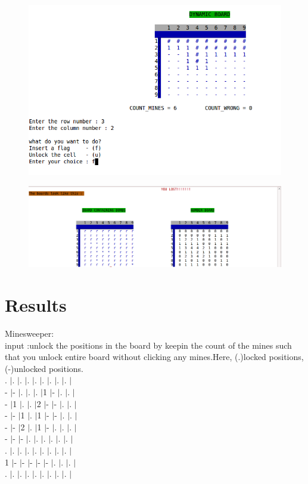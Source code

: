 \documentclass{article}
\begin{document}
\thispagestyle{empty}
\begin{figure}[htb]
\ifpdf
\includegraphics[scale=.40]{m2.png}
\else
\fi
\end{figure}




\thispagestyle{empty}
\begin{figure}[htb]
\ifpdf
\includegraphics[scale=.40]{m4.png}
\else
\fi
\end{figure}




\newpage
\section{Results}


Minesweeper:\\

input :unlock the positions in the board by keepin the count of
the mines such that you unlock entire board without clicking any
mines.Here, (.)locked positions,(-)unlocked positions.\\ 
. $|$. $|$. $|$. $|$. $|$. $|$. $|$. $|$. $|$\\
- $|$- $|$. $|$. $|$. $|$1 $|$- $|$. $|$. $|$\\
- $|$1 $|$. $|$. $|$2 $|$- $|$- $|$. $|$. $|$\\ 
- $|$- $|$1 $|$. $|$1 $|$- $|$- $|$. $|$. $|$\\ 
- $|$- $|$2 $|$. $|$1 $|$- $|$. $|$. $|$. $|$\\
- $|$- $|$- $|$. $|$. $|$. $|$. $|$. $|$. $|$\\
. $|$. $|$. $|$. $|$. $|$. $|$. $|$. $|$. $|$\\ 
1 $|$- $|$- $|$- $|$- $|$- $|$. $|$. $|$. $|$\\ 
. $|$. $|$. $|$. $|$. $|$. $|$. $|$. $|$. $|$\\ 
\end{document}
